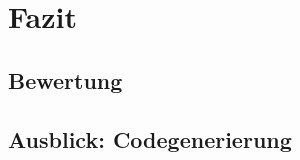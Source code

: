 \thispagestyle{firstPage}

\section{Fazit}
\label{sec:fazit}

\subsection{Bewertung}
\label{subsec:bewertung}

\subsection{Ausblick: Codegenerierung}
\label{subsec:codegenerierung}
